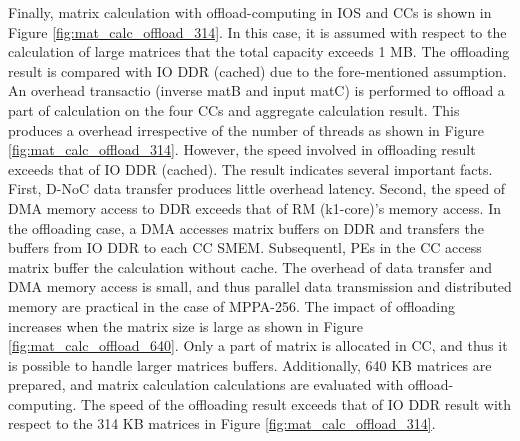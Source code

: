 \documentclass{sig-alternate-05-2015}
\begin{document}
Finally, matrix calculation with offload-computing in IOS and CCs is shown in Figure \ref{fig:mat_calc_offload_314}.
In this case, it is assumed with respect to the calculation of large matrices that the total capacity exceeds 1 MB.
The offloading result is compared with IO DDR (cached) due to the fore-mentioned assumption. 
An overhead transactio (inverse matB and input matC) is performed to offload a part of calculation on the four CCs and aggregate calculation result.
This produces a overhead irrespective of the number of threads as shown in Figure \ref{fig:mat_calc_offload_314}.
However, the speed involved in offloading result exceeds that of IO DDR (cached).
The result indicates several important facts.
First, D-NoC data transfer produces little overhead latency.
Second, the speed of DMA memory access to DDR exceeds that of RM (k1-core)'s memory access.
In the offloading case, a DMA accesses matrix buffers on DDR and transfers the buffers from IO DDR to each CC SMEM.
Subsequentl, PEs in the CC access matrix buffer the calculation without cache.
The overhead of data transfer and DMA memory access is small, and thus parallel data transmission and distributed memory are practical in the case of MPPA-256.
The impact of offloading increases when the matrix size is large as shown in Figure \ref{fig:mat_calc_offload_640}.
Only a part of matrix is allocated in CC, and thus it is possible to handle larger matrices buffers.
Additionally, 640 KB matrices are prepared, and matrix calculation calculations are evaluated with offload-computing.
The speed of the offloading result exceeds that of IO DDR result with respect to the 314 KB matrices in Figure \ref{fig:mat_calc_offload_314}.
\end{document}
